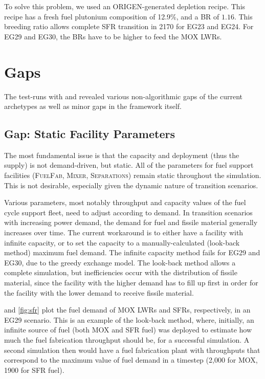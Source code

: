 To solve this problem, we used an ORIGEN-generated depletion recipe. This recipe
has a fresh fuel plutonium composition of 12.9\%, and a BR of $1.16$. This breeding
ratio allows complete SFR transition in 2170 for EG23 and EG24. For EG29 and EG30,
the BRs have to be higher to feed the \gls{MOX} \glspl{LWR}. 


\section{Gaps}
The test-runs with \Cyclus and \Cycamore revealed various non-algorithmic gaps
of the current \Cycamore archetypes as well as minor gaps in the \Cyclus framework itself. 

\subsection{Gap: Static Facility Parameters}
The most fundamental issue is that the capacity and deployment (thus the supply) is not
demand-driven, but static. All of the parameters for fuel support facilities (\textsc{FuelFab}\xspace,
\textsc{Mixer}\xspace, \textsc{Separations}\xspace) remain static throughout the simulation.
This is not desirable, especially given the dynamic nature of transition scenarios. 

Various parameters, most notably throughput and capacity values of the fuel cycle support fleet,
need to adjust according to demand. In transition scenarios with increasing power demand, the 
demand for fuel and fissile material generally increases over time. The current workaround is to either
have a facility with infinite capacity, or to set the capacity to a manually-calculated (look-back method)
maximum fuel demand. The infinite capacity method fails for EG29 and EG30, due to the greedy exchange
model. The look-back method allows a complete simulation, but inefficiencies occur with the distribution
of fissile material, since the facility with the higher demand has to fill up first in order for the facility
with the lower demand to receive fissile material. 



 and \cref{fig:sfr} plot the fuel demand of \gls{MOX} \glspl{LWR} and \glspl{SFR},
respectively, in an EG29 scenario. This is an example of the look-back method, where, initially, an infinite source
of fuel (both \gls{MOX} and \gls{SFR} fuel) was deployed to estimate how much the fuel fabrication
throughput should be, for a successful simulation. A second simulation then would have a 
fuel fabrication plant with throughputs that correspond to the maximum value of fuel demand in a timestep
(2,000 for \gls{MOX}, 1900 for \gls{SFR} fuel).

